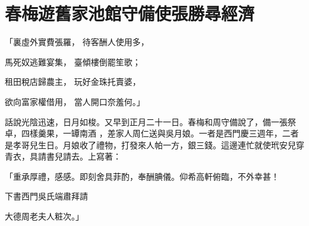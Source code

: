 %

\chapter{春梅遊舊家池館\KG 守備使張勝尋經濟}


「裏虛外實費張羅，  待客酬人使用多，

馬死奴逃難宴集，  臺傾樓倒罷笙歌；

租田稅店歸農主，  玩好金珠托賣婆，

欲向富家權借用，  當人開口奈羞何。」

話說光陰迅速，日月如梭。又早到正月二十一日。春梅和周守備說了，備一張祭卓，四樣羹果，一罈南酒 ，差家人周仁送與吳月娘。一者是西門慶三週年，二者是孝哥兒生日。月娘收了禮物，打發來人帕一方，銀三錢。這邊連忙就使玳安兒穿青衣，具請書兒請去。上寫著：

「重承厚禮，感感。即刻舍具菲酌，奉酬腆儀。仰希高軒俯臨，不外幸甚！

下書西門吳氏端肅拜請

大德周老夫人粧次。」

